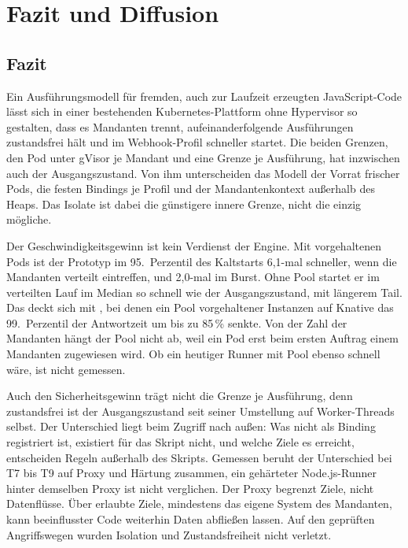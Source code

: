 \clearpage
\section{Fazit und Diffusion} \label{sec:Diffusion}

\subsection{Fazit}
\label{sec:diffusion:fazit}

Ein Ausführungsmodell für fremden, auch zur Laufzeit erzeugten JavaScript-Code lässt sich in einer bestehenden
Kubernetes-Plattform ohne Hypervisor so gestalten, dass es Mandanten trennt, aufeinanderfolgende Ausführungen
zustandsfrei hält und im Webhook-Profil schneller startet. Die beiden Grenzen, den Pod unter gVisor je Mandant und eine
Grenze je Ausführung, hat inzwischen auch der Ausgangszustand. Von ihm unterscheiden das Modell der Vorrat frischer
Pods, die festen Bindings je Profil und der Mandantenkontext außerhalb des Heaps. Das Isolate ist dabei die günstigere
innere Grenze, nicht die einzig mögliche.

Der Geschwindigkeitsgewinn ist kein Verdienst der Engine. Mit vorgehaltenen Pods ist der Prototyp im 95.\ Perzentil
des Kaltstarts 6,1-mal schneller, wenn die Mandanten verteilt eintreffen, und 2,0-mal im Burst. Ohne Pool startet er im
verteilten Lauf im Median so schnell wie der Ausgangszustand, mit längerem Tail. Das deckt sich mit \textcite[S.~1]{lin_mitigating_2019},
bei denen ein Pool vorgehaltener Instanzen auf Knative das 99.\ Perzentil der Antwortzeit um bis zu 85\,\% senkte. Von der Zahl
der Mandanten hängt der Pool nicht ab, weil ein Pod erst beim ersten Auftrag einem Mandanten zugewiesen wird. Ob ein
heutiger Runner mit Pool ebenso schnell wäre, ist nicht gemessen.

Auch den Sicherheitsgewinn trägt nicht die Grenze je Ausführung, denn zustandsfrei ist der Ausgangszustand seit seiner
Umstellung auf Worker-Threads selbst. Der Unterschied liegt beim Zugriff nach außen: Was nicht als Binding registriert
ist, existiert für das Skript nicht, und welche Ziele es erreicht, entscheiden Regeln außerhalb des Skripts. Gemessen
beruht der Unterschied bei T7 bis T9 auf Proxy und Härtung zusammen, ein gehärteter Node.js-Runner hinter demselben Proxy
ist nicht verglichen. Der Proxy begrenzt Ziele, nicht Datenflüsse. Über erlaubte Ziele, mindestens das eigene System
des Mandanten, kann beeinflusster Code weiterhin Daten abfließen lassen. Auf den geprüften Angriffswegen wurden
Isolation und Zustandsfreiheit nicht verletzt.

